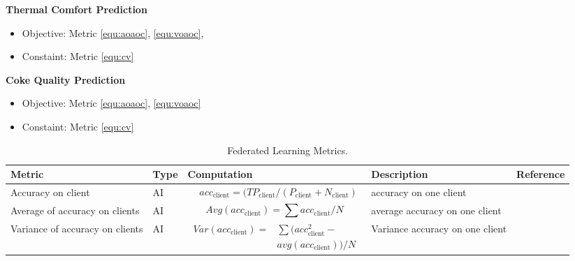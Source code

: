 \noindent \textbf{Thermal Comfort Prediction}
\begin{itemize}
    \item Objective: Metric \ref{equ:aoaoc}, \ref{equ:voaoc}, 
    \item Constaint: Metric \ref{equ:cv}
\end{itemize}

\noindent \textbf{Coke Quality Prediction}
\begin{itemize}
    \item Objective: Metric \ref{equ:aoaoc}, \ref{equ:voaoc}
    \item Constaint: Metric \ref{equ:cv}
\end{itemize}

\begin{table}[h]
\caption{Federated Learning Metrics.} 
\label{tab:fl}
\begin{tabular}{|p{3cm}|l|p{6cm}|p{3cm}|p{1.5cm}|}

\hline
Metric                 & Type      & Computation & Description                                                                & Reference \\ \hline
Accuracy on client
& AI 
& 
\parbox{3cm}{
    \begin{equation} \label{equ:aoc} 
    \begin{split}
& acc_{\text{client}} = (TP_{\text{client}} 
 / (P_{\text{client}} + N_{\text{client}})
    \end{split} 
    \end{equation} 
}
& accuracy on one client 
& \cite{DBLP:conf/iclr/LiSBS20}       
\\ \hline

Average of accuracy on clients
& AI
&
\parbox{3cm}{
    \begin{equation} \label{equ:aoaoc} 
    Avg(acc_{\text{client}}) = \sum acc_{\text{client}} / N
    \end{equation}
}
& average accuracy on one client 
& \cite{DBLP:conf/iclr/LiSBS20}       
\\ \hline

Variance of accuracy on clients
& AI
&
\parbox{3cm}{
    \begin{equation} \label{equ:voaoc} 
    \begin{split}
    Var(acc_{\text{client}}) =
    & \sum (acc_{\text{client}}^2 - \\ 
    & avg(acc_{\text{client}})) / N
    \end{split}
    \end{equation}
}
& Variance accuracy on one client 
& \cite{DBLP:conf/iclr/LiSBS20}       
\\ \hline


\end{tabular}
\end{table}

